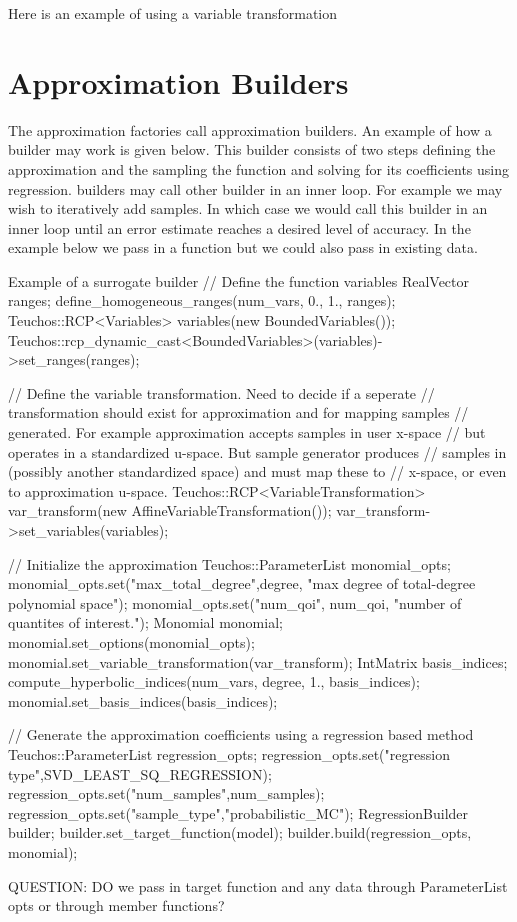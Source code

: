 \documentclass[dakotalogo]{dakota-article}
\begin{document}
Here is an example of using a variable transformation
\section{Approximation Builders}
The approximation factories call approximation builders. An example of
how a builder may work is given below. This builder consists of two
steps defining the approximation and the sampling the function and
solving for its coefficients using regression. builders may call
other builder in an inner loop. For example we may wish to iteratively
add samples. In which case we would call this builder in an inner loop
until an error estimate reaches a desired level of accuracy. In the
example below we pass in a function but we could also pass in existing data.
\begin{codelisting}{Example of a surrogate builder}
// Define the function variables
  RealVector ranges;
  define_homogeneous_ranges(num_vars, 0., 1., ranges);
  Teuchos::RCP<Variables> variables(new BoundedVariables());
  Teuchos::rcp_dynamic_cast<BoundedVariables>(variables)->set_ranges(ranges);

  // Define the variable transformation. Need to decide if a seperate
  // transformation should exist for approximation and for mapping samples
  // generated. For example approximation accepts samples in user x-space
  // but operates in a standardized u-space. But sample generator produces
  // samples in (possibly another standardized space) and must map these to
  // x-space, or even to approximation u-space.
  Teuchos::RCP<VariableTransformation> var_transform(new AffineVariableTransformation());
  var_transform->set_variables(variables);

// Initialize the approximation
  Teuchos::ParameterList monomial_opts;
  monomial_opts.set("max_total_degree",degree,
		    "max degree of total-degree polynomial space");
  monomial_opts.set("num_qoi", num_qoi, "number of quantites of interest.");
  Monomial monomial;
  monomial.set_options(monomial_opts);
  monomial.set_variable_transformation(var_transform);
  IntMatrix basis_indices;
  compute_hyperbolic_indices(num_vars, degree, 1., basis_indices);
  monomial.set_basis_indices(basis_indices);

  // Generate the approximation coefficients using a regression based method
  Teuchos::ParameterList regression_opts;
  regression_opts.set("regression type",SVD_LEAST_SQ_REGRESSION);
  regression_opts.set("num_samples",num_samples);
  regression_opts.set("sample_type","probabilistic_MC");
  RegressionBuilder builder;
  builder.set_target_function(model);
  builder.build(regression_opts, monomial);
\end{codelisting}
QUESTION: DO we pass in target function and any data through
ParameterList opts or through member functions?
\end{document}
